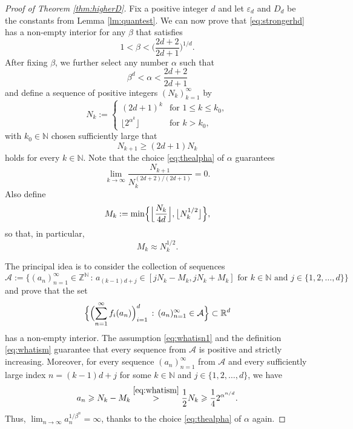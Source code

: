 \documentclass[11pt,letterpaper,reqno]{amsart}
\numberwithin{equation}{section}
\theoremstyle{definition}
\numberwithin{equation}{section}
\begin{document}
\begin{proof}[Proof of Theorem \ref{thm:higherD}]
Fix a positive integer $d$ and let $\varepsilon_d$ and $D_d$ be the constants from Lemma \ref{lm:quantest}.
We can now prove that \eqref{eq:strongerhd} has a non-empty interior for any $\beta$ that satisfies
\begin{equation}\label{eq:thebeta}
1 < \beta < \Big(\frac{2d+2}{2d+1}\Big)^{1/d}.
\end{equation}
After fixing $\beta$, we further select any number $\alpha$ such that
\begin{equation}\label{eq:thealpha}
\beta^d < \alpha < \frac{2d+2}{2d+1}
\end{equation}
and define a sequence of positive integers $(N_k)_{k=1}^{\infty}$ by
\[ N_k := \begin{cases}
(2d+1)^k & \text{for } 1\leqslant k\leqslant k_0, \\
\big\lfloor 2^{\alpha^k} \big\rfloor & \text{for } k>k_0,
\end{cases} \]
with $k_0\in\mathbb{N}$ chosen sufficiently large that
\begin{equation}\label{eq:whatisn1}
N_{k+1} \geqslant (2d+1) N_k
\end{equation}
holds for every $k\in\mathbb{N}$.
Note that the choice \eqref{eq:thealpha} of $\alpha$ guarantees
\begin{equation}\label{eq:whoan}
\lim_{k\to\infty} \frac{N_{k+1}}{N_k^{(2d+2)/(2d+1)}} = 0.
\end{equation}
Also define
\begin{equation}\label{eq:whatism}
M_k := \min\Bigl\{ \Big\lfloor\frac{N_k}{4d}\Big\rfloor , \big\lfloor N_k^{1/2}\big\rfloor \Bigr\},
\end{equation}
so that, in particular,
\begin{equation}\label{eq:whatism9}
M_k\approx N_k^{1/2}.
\end{equation}

The principal idea is to consider the collection of sequences
\[ \mathcal{A} := \big\{ (a_n)_{n=1}^{\infty} \in {\mathbb{Z}}^{\mathbb{N}} \,:\, a_{(k-1)d+j} \in [j N_k-M_k,j N_k+M_k] \text{ for } k\in\mathbb{N} \text{ and } j\in\{1,2,\ldots,d\} \big\} \]
and prove that the set
\begin{equation}\label{eq:fullsersums}
\Bigl\{ \Bigl( \sum_{n=1}^{\infty} f_i(a_n) \Bigr)_{i=1}^{d} \,:\, (a_n)_{n=1}^{\infty} \in\mathcal{A} \Bigr\} \subset \mathbb{R}^d
\end{equation}
has a non-empty interior.
The assumption \eqref{eq:whatisn1} and the definition \eqref{eq:whatism} guarantee that every sequence from $\mathcal{A}$ is positive and strictly increasing.
Moreover, for every sequence $(a_n)_{n=1}^{\infty}$ from $\mathcal{A}$ and every sufficiently large index $n=(k-1)d+j$ for some $k\in\mathbb{N}$ and $j\in\{1,2,\ldots,d\}$, we have
\[ a_n \geqslant N_k - M_k \stackrel{\eqref{eq:whatism}}{>} \frac{1}{2} N_k \geqslant \frac{1}{4} 2^{\alpha^{n/d}}. \]
Thus, $\lim_{n\to\infty} a_n^{1/\beta^n} = \infty$, thanks to the choice \eqref{eq:thealpha} of $\alpha$ again.


\end{proof}
\end{document}

